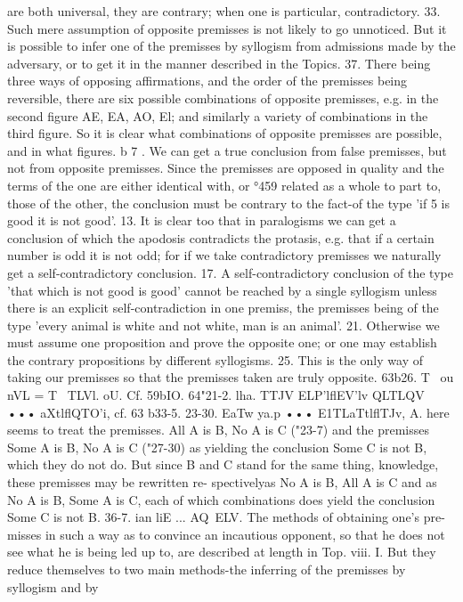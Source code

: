 are both universal, they are contrary; when one is particular,
contradictory.
33. Such mere assumption of opposite premisses is not likely
to go unnoticed. But it is possible to infer one of the premisses by
syllogism from admissions made by the adversary, or to get it in
the manner described in the Topics.
37. There being three ways of opposing affirmations, and the
order of the premisses being reversible, there are six possible
combinations of opposite premisses, e.g. in the second figure AE,
EA, AO, El; and similarly a variety of combinations in the third
figure. So it is clear what combinations of opposite premisses are
possible, and in what figures.
b 7 . We can get a true conclusion from false premisses, but not
from opposite premisses. Since the premisses are opposed in
quality and the terms of the one are either identical with, or
°459
related as a whole to part to, those of the other, the conclusion
must be contrary to the fact-of the type 'if 5 is good it is not
good'.
13. It is clear too that in paralogisms we can get a conclusion
of which the apodosis contradicts the protasis, e.g. that if a certain
number is odd it is not odd; for if we take contradictory premisses
we naturally get a self-contradictory conclusion.
17. A self-contradictory conclusion of the type 'that which is
not good is good' cannot be reached by a single syllogism unless
there is an explicit self-contradiction in one premiss, the premisses
being of the type 'every animal is white and not white, man is an
animal'.
21. Otherwise we must assume one proposition and prove the
opposite one; or one may establish the contrary propositions by
different syllogisms.
25. This is the only way of taking our premisses so that the
premisses taken are truly opposite.
63b26. T~ ou nVL = T~ TLVl. oU. Cf. 59bIO.
64"21-2. lha. TTJV ELP'lflEV'lv QLTLQV ••• aXtlflQTO'i, cf. 63 b33-5.
23-30. EaTw ya.p ••• E1TLaTtlflTJv, A. here seems to treat the
premisses. All A is B, No A is C ("23-7) and the premisses Some
A is B, No A is C ("27-30) as yielding the conclusion Some C is
not B, which they do not do. But since B and C stand for the
same thing, knowledge, these premisses may be rewritten re-
spectivelyas No A is B, All A is C and as No A is B, Some A
is C, each of which combinations does yield the conclusion Some
C is not B.
36-7. ian liE ... AQ~ELV. The methods of obtaining one's pre-
misses in such a way as to convince an incautious opponent, so
that he does not see what he is being led up to, are described at
length in Top. viii. I. But they reduce themselves to two main
methods-the inferring of the premisses by syllogism and by
